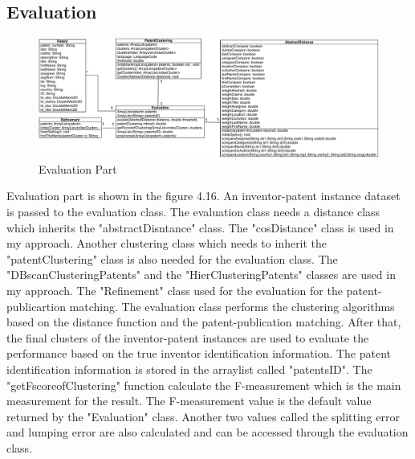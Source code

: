 \subsection{Evaluation}
 \begin{figure}
\centering
\includegraphics[width=\headwidth]{evaluation.pdf}
\caption{Evaluation Part}
\end{figure}
Evaluation part is shown in the figure 4.16. An inventor-patent instance dataset is passed to the evaluation class. The evaluation class needs a distance class which inherits the "abstractDisntance" class. The "cosDistance" class is used in my approach. Another clustering class which needs to inherit the "patentClustering" class is also needed for the evaluation class. The "DBscanClusteringPatents" and the "HierClusteringPatents" classes are used in my approach. The "Refinement" class  used for the evaluation for the patent-publicartion matching. The evaluation class performs the clustering algorithms based on the distance function and the patent-publication matching. After that, the final clusters of the inventor-patent instances are used to evaluate the performance based on the true inventor identification information. The patent identification information is stored in the arraylist called "patentsID". The "getFscoreofClustering" function calculate the F-measurement which is the main measurement for the result. The F-measurement value is the default value returned by the "Evaluation" class. Another two values called the splitting error and lumping error are also calculated and can be accessed through the evaluation class.
 
